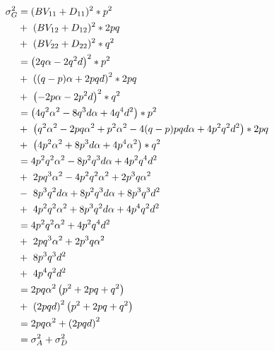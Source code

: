 \documentclass[
]{book}
\theoremstyle{definition}
\theoremstyle{definition}
\theoremstyle{definition}
\theoremstyle{remark}
\begin{document}
\begin{align}
\sigma_G^2  &=   (BV_{11} + D_{11})^2 * p^2                                       \notag \\
            &   +\  (BV_{12} + D_{12})^2 * 2pq                                    \notag \\
            &   +\  (BV_{22} + D_{22})^2 * q^2                                    \notag \\
            &=      \left(2q\alpha - 2q^2d   \right)^2 * p^2                      \notag \\
            &   +\  \left((q-p)\alpha + 2pqd \right)^2 * 2pq                      \notag \\
            &   +\  \left(-2p\alpha - 2p^2d  \right)^2 * q^2                      \notag \\
            &=      \left(4q^2\alpha^2 - 8q^3d\alpha + 4q^4d^2  \right) * p^2     \notag \\
            &   +\  \left(q^2\alpha^2 - 2pq\alpha^2 + p^2\alpha^2
                           - 4(q-p)pqd\alpha + 4p^2q^2d^2\right) * 2pq            \notag \\
            &   +\  \left(4p^2\alpha^2 + 8p^3d\alpha + 4p^4\alpha^2 \right) * q^2 \notag \\
            &=      4p^2q^2\alpha^2 - 8p^2q^3d\alpha + 4p^2q^4d^2                 \notag \\
            &   +\  2pq^3\alpha^2 - 4p^2q^2\alpha^2+ 2p^3q\alpha^2                \notag \\
            &   -\  8p^3q^2d\alpha + 8p^2q^3d\alpha + 8p^3q^3d^2                  \notag \\
            &   +\  4p^2q^2\alpha^2 + 8p^3q^2d\alpha + 4p^4q^2d^2                 \notag \\
            &=      4p^2q^2\alpha^2 + 4p^2q^4d^2                                  \notag \\
            &   +\  2pq^3\alpha^2 + 2p^3q\alpha^2                                 \notag \\
            &   +\  8p^3q^3d^2                                                    \notag \\
            &   +\  4p^4q^2d^2                                                    \notag \\
            &=      2pq\alpha^2 \left(p^2 + 2pq + q^2 \right)                     \notag \\
            &   +\  \left(2pqd \right)^2 \left(p^2 + 2pq + q^2 \right)            \notag \\
            &=      2pq\alpha^2 + \left(2pqd \right)^2                            \notag \\
            &=      \sigma_A^2 + \sigma_D^2
\label{eq:GenVarZWD}
\end{align}
\end{document}
